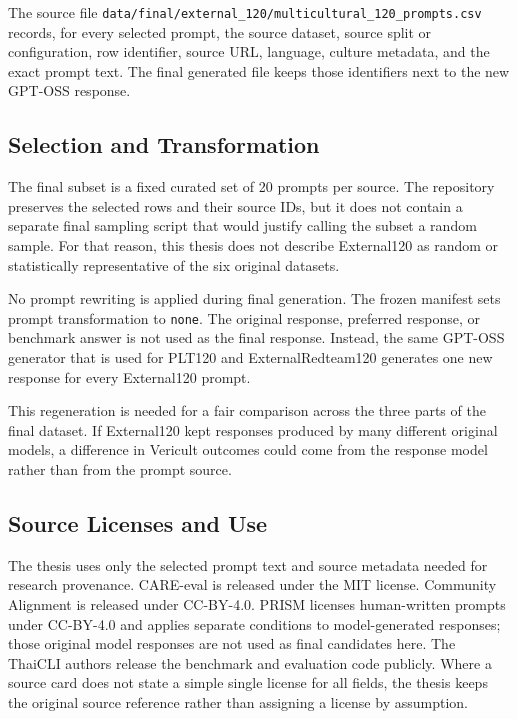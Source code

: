 The source file \texttt{data/final/external\_120/multicultural\_120\_prompts.csv} records, for every selected prompt, the source dataset, source split or configuration, row identifier, source URL, language, culture metadata, and the exact prompt text. The final generated file keeps those identifiers next to the new GPT-OSS response.

\subsection{Selection and Transformation}

The final subset is a fixed curated set of 20 prompts per source. The repository preserves the selected rows and their source IDs, but it does not contain a separate final sampling script that would justify calling the subset a random sample. For that reason, this thesis does not describe External120 as random or statistically representative of the six original datasets.

No prompt rewriting is applied during final generation. The frozen manifest sets prompt transformation to \texttt{none}. The original response, preferred response, or benchmark answer is not used as the final response. Instead, the same GPT-OSS generator that is used for PLT120 and ExternalRedteam120 generates one new response for every External120 prompt.

This regeneration is needed for a fair comparison across the three parts of the final dataset. If External120 kept responses produced by many different original models, a difference in Vericult outcomes could come from the response model rather than from the prompt source.

\subsection{Source Licenses and Use}

The thesis uses only the selected prompt text and source metadata needed for research provenance. CARE-eval is released under the MIT license. Community Alignment is released under CC-BY-4.0. PRISM licenses human-written prompts under CC-BY-4.0 and applies separate conditions to model-generated responses; those original model responses are not used as final candidates here. The ThaiCLI authors release the benchmark and evaluation code publicly. Where a source card does not state a simple single license for all fields, the thesis keeps the original source reference rather than assigning a license by assumption.

